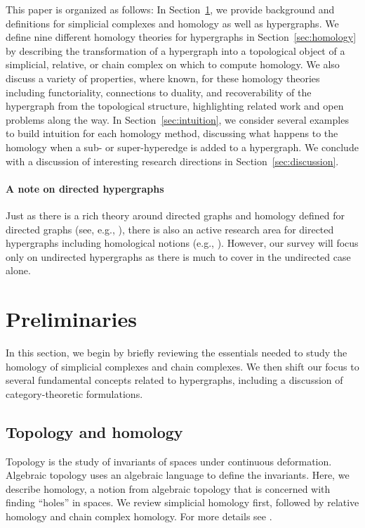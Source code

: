 \documentclass{amsart}
\begin{document}
This paper is organized as follows: In Section~\ref{sec:preliminaries}, we provide background and definitions for simplicial complexes and homology as well as hypergraphs. We define nine different homology theories for hypergraphs in Section~\ref{sec:homology} by describing the transformation of a hypergraph into a topological object of a simplicial, relative, or chain complex on which to compute homology. We also discuss a variety of properties, where known, for these homology theories including functoriality, connections to duality, and recoverability of the hypergraph from the topological structure, highlighting related work and open problems along the way. In Section~\ref{sec:intuition}, we consider several examples to build intuition for each homology method, discussing what happens to the homology when a sub- or super-hyperedge is added to a hypergraph. We conclude with a discussion of interesting research directions in Section~\ref{sec:discussion}.

\paragraph{A note on directed hypergraphs} Just as there is a rich theory around directed graphs and homology defined for directed graphs (see, e.g., \cite{chowdhury_persistent_2018, DOCHTERMANN2023103704, GrigoryanLinMuranov2020}), there is also an active research area for directed hypergraphs including homological notions (e.g., \cite{bubenik2024homotopy,diestel2020homological}).
However, our survey will focus only on undirected hypergraphs as there is much to cover in the undirected case alone.
\section{Preliminaries}
\label{sec:preliminaries}

In this section, we begin by briefly reviewing the essentials needed to study the homology of simplicial complexes and chain complexes. We then shift our focus to several fundamental concepts related to hypergraphs, including a discussion of category-theoretic formulations.

\subsection{Topology and homology}
Topology is the study of invariants of spaces under continuous deformation.
Algebraic topology uses an algebraic language to define the invariants.
Here, we describe homology, a notion from algebraic topology that is concerned with finding ``holes'' in spaces.
We review simplicial homology first, followed by relative homology and chain complex homology.
For more details see \cite{Hatcher}.
\end{document}
